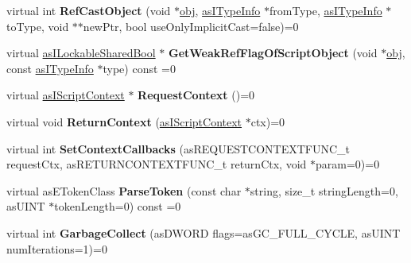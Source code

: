 \begin{DoxyCompactItemize}
virtual int {\bfseries Ref\+Cast\+Object} (void $\ast$\hyperlink{structobj}{obj}, \hyperlink{classas_i_type_info}{as\+I\+Type\+Info} $\ast$from\+Type, \hyperlink{classas_i_type_info}{as\+I\+Type\+Info} $\ast$to\+Type, void $\ast$$\ast$new\+Ptr, bool use\+Only\+Implicit\+Cast=false)=0
\item 
\mbox{\label{classas_i_script_engine_ab31103bef62096445fe03632de691827}} 
virtual \hyperlink{classas_i_lockable_shared_bool}{as\+I\+Lockable\+Shared\+Bool} $\ast$ {\bfseries Get\+Weak\+Ref\+Flag\+Of\+Script\+Object} (void $\ast$\hyperlink{structobj}{obj}, const \hyperlink{classas_i_type_info}{as\+I\+Type\+Info} $\ast$type) const =0
\item 
\mbox{\label{classas_i_script_engine_a32391ee83e58083b406ba068ab2ee049}} 
virtual \hyperlink{classas_i_script_context}{as\+I\+Script\+Context} $\ast$ {\bfseries Request\+Context} ()=0
\item 
\mbox{\label{classas_i_script_engine_a22e42bf32902cbd6885731a6beeaca20}} 
virtual void {\bfseries Return\+Context} (\hyperlink{classas_i_script_context}{as\+I\+Script\+Context} $\ast$ctx)=0
\item 
\mbox{\label{classas_i_script_engine_ae5ba9fe99b72c60392cdaeef164f2c65}} 
virtual int {\bfseries Set\+Context\+Callbacks} (as\+R\+E\+Q\+U\+E\+S\+T\+C\+O\+N\+T\+E\+X\+T\+F\+U\+N\+C\+\_\+t request\+Ctx, as\+R\+E\+T\+U\+R\+N\+C\+O\+N\+T\+E\+X\+T\+F\+U\+N\+C\+\_\+t return\+Ctx, void $\ast$param=0)=0
\item 
\mbox{\label{classas_i_script_engine_a57ecbd86ae9370684877c755e83cef0d}} 
virtual as\+E\+Token\+Class {\bfseries Parse\+Token} (const char $\ast$string, size\+\_\+t string\+Length=0, as\+U\+I\+NT $\ast$token\+Length=0) const =0
\item 
\mbox{\label{classas_i_script_engine_a17511a1de72ecdb836b974768f2ec422}} 
virtual int {\bfseries Garbage\+Collect} (as\+D\+W\+O\+RD flags=as\+G\+C\+\_\+\+F\+U\+L\+L\+\_\+\+C\+Y\+C\+LE, as\+U\+I\+NT num\+Iterations=1)=0
\item 
\mbox{\label{classas_i_script_engine_a166e6cdd0cb35bcfd942824d8e882783}} 
$$
\end{DoxyCompactItemize}
